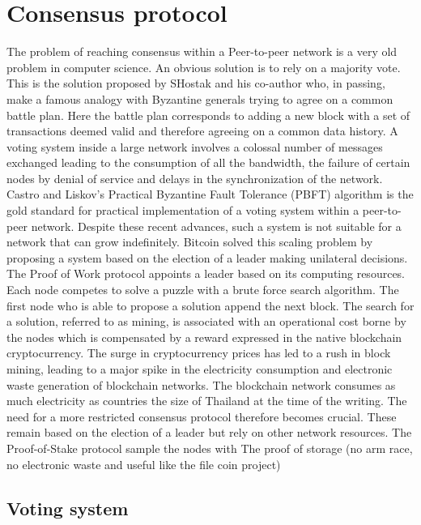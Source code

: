 \chapter{Consensus protocol}\label{chap:consensus}

The problem of reaching consensus within a Peer-to-peer network is a very old problem in computer science. An obvious solution is to rely on a majority vote. This is the solution proposed by SHostak and his co-author who, in passing, make a famous analogy with Byzantine generals trying to agree on a common battle plan. Here the battle plan corresponds to adding a new block with a set of transactions deemed valid and therefore agreeing on a common data history. A voting system inside a large network involves a colossal number of messages exchanged leading to the consumption of all the bandwidth, the failure of certain nodes by denial of service and delays in the synchronization of the network. Castro and Liskov's Practical Byzantine Fault Tolerance (PBFT) algorithm is the gold standard for practical implementation of a voting system within a peer-to-peer network. Despite these recent advances, such a system is not suitable for a network that can grow indefinitely. Bitcoin solved this scaling problem by proposing a system based on the election of a leader making unilateral decisions. The Proof of Work protocol appoints a leader based on its computing resources. Each node competes to solve a puzzle with a brute force search algorithm. The first node who is able to propose a solution append the next block. The search for a solution, referred to as mining, is associated with an operational cost borne by the nodes which is compensated by a reward expressed in the native blockchain cryptocurrency. The surge in cryptocurrency prices has led to a rush in block mining, leading to a major spike in the electricity consumption and electronic waste generation of blockchain networks. The blockchain network consumes as much electricity as countries the size of Thailand at the time of the writing. The need for a more restricted consensus protocol therefore becomes crucial. These remain based on the election of a leader but rely on other network resources. The Proof-of-Stake protocol sample the nodes with
The proof of storage (no arm race, no electronic waste and useful like the file coin project)
\section{Voting system}\label{sec:voting}
